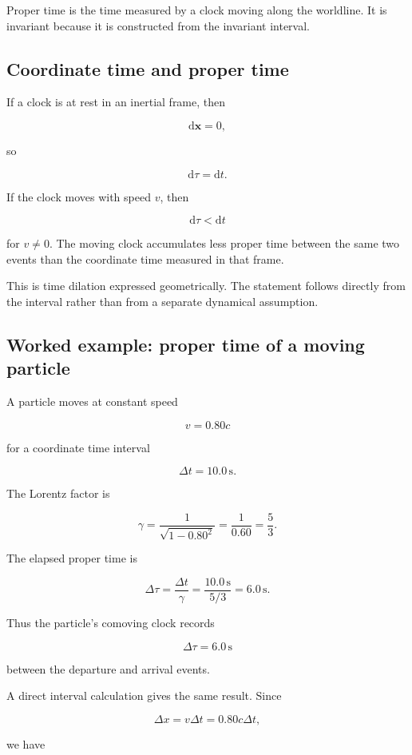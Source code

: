 Proper time is the time measured by a clock moving along the worldline. It is invariant because it is constructed from the invariant interval.

\subsection{Coordinate time and proper time}

If a clock is at rest in an inertial frame, then

\[
\mathrm{d}\mathbf{x}=0,
\]

so

\[
\mathrm{d}\tau=\mathrm{d}t.
\]

If the clock moves with speed \(v\), then

\[
\mathrm{d}\tau<\mathrm{d}t
\]

for \(v\neq0\). The moving clock accumulates less proper time between the same two events than the coordinate time measured in that frame.

This is time dilation expressed geometrically. The statement follows directly from the interval rather than from a separate dynamical assumption.

\subsection{Worked example: proper time of a moving particle}

A particle moves at constant speed

\[
v=0.80c
\]

for a coordinate time interval

\[
\Delta t=10.0\,\mathrm{s}.
\]

The Lorentz factor is

\[
\gamma
=
\frac{1}{\sqrt{1-0.80^{2}}}
=
\frac{1}{0.60}
=
\frac{5}{3}.
\]

The elapsed proper time is

\[
\Delta\tau
=
\frac{\Delta t}{\gamma}
=
\frac{10.0\,\mathrm{s}}{5/3}
=
6.0\,\mathrm{s}.
\]

Thus the particle's comoving clock records

\[
\boxed{
\Delta\tau=6.0\,\mathrm{s}
}
\]

between the departure and arrival events.

A direct interval calculation gives the same result. Since

\[
\Delta x=v\Delta t=0.80c\Delta t,
\]

we have

